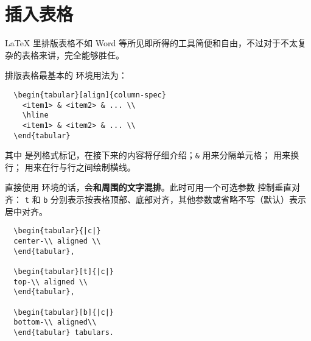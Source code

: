 \chapter{插入表格}
\LaTeX{} 里排版表格不如 Word 等所见即所得的工具简便和自由，不过对于不太复杂的表格来讲，完全能够胜任。

排版表格最基本的  环境用法为：
\begin{lstlisting}
  \begin{tabular}[align]{column-spec}
    <item1> & <item2> & ... \\
    \hline
    <item1> & <item2> & ... \\
  \end{tabular}
\end{lstlisting}
其中  是列格式标记，在接下来的内容将仔细介绍；\texttt\& 用来分隔单元格；
\crcmd{} 用来换行； 用来在行与行之间绘制横线。


直接使用  环境的话，会\textbf{和周围的文字混排}。此时可用一个可选参数  控制垂直对齐：
\verb|t| 和 \verb|b| 分别表示按表格顶部、底部对齐，其他参数或省略不写（默认）表示居中对齐。
\begin{lstlisting}
  \begin{tabular}{|c|}
  center-\\ aligned \\
  \end{tabular},
  
  \begin{tabular}[t]{|c|}
  top-\\ aligned \\
  \end{tabular},
  
  \begin{tabular}[b]{|c|}
  bottom-\\ aligned\\
  \end{tabular} tabulars.
\end{lstlisting}
\begin{center}
\end{center}

